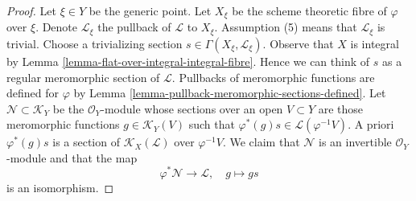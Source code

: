 \documentclass[10pt,a4paper]{amsart}
\theoremstyle{plain}
\theoremstyle{definition}
\theoremstyle{remark}
\numberwithin{equation}{subsection}
\begin{document}
\begin{proof}
Let $\xi \in Y$ be the generic point. Let $X_\xi$ be the scheme theoretic
fibre of $\varphi$ over $\xi$. Denote $\mathcal{L}_\xi$ the pullback of
$\mathcal{L}$ to $X_\xi$. Assumption (5) means that $\mathcal{L}_\xi$
is trivial. Choose a trivializing section
$s \in \Gamma(X_\xi, \mathcal{L}_\xi)$. Observe that $X$ is integral by
Lemma \ref{lemma-flat-over-integral-integral-fibre}.
Hence we can think of $s$ as a regular meromorphic section of $\mathcal{L}$.
Pullbacks of meromorphic functions are defined for
$\varphi$ by Lemma \ref{lemma-pullback-meromorphic-sections-defined}.
Let $\mathcal{N} \subset \mathcal{K}_Y$ be the $\mathcal{O}_Y$-module
whose sections over an open $V \subset Y$ are those meromorphic functions
$g \in \mathcal{K}_Y(V)$ such that
$\varphi^*(g)s \in \mathcal{L}(\varphi^{-1}V)$.
A priori $\varphi^*(g)s$ is a section of $\mathcal{K}_X(\mathcal{L})$ over
$\varphi^{-1}V$. We claim that $\mathcal{N}$ is an invertible
$\mathcal{O}_Y$-module and that the map
$$
\varphi^*\mathcal{N} \longrightarrow \mathcal{L},\quad
g \longmapsto gs
$$
is an isomorphism.


\end{proof}
\end{document}
